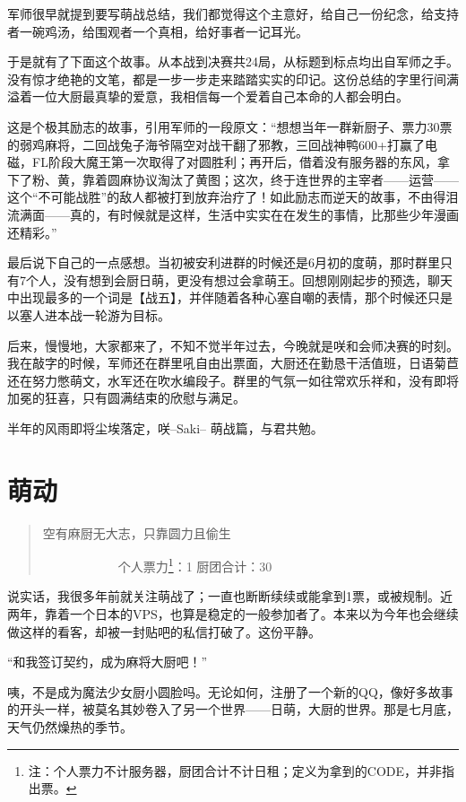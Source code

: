 军师很早就提到要写萌战总结，我们都觉得这个主意好，给自己一份纪念，给支持者一碗鸡汤，给围观者一个真相，给好事者一记耳光。

于是就有了下面这个故事。从本战到决赛共24局，从标题到标点均出自军师之手。没有惊才绝艳的文笔，都是一步一步走来踏踏实实的印记。这份总结的字里行间满溢着一位大厨最真挚的爱意，我相信每一个爱着自己本命的人都会明白。

这是个极其励志的故事，引用军师的一段原文：“想想当年一群新厨子、票力30票的弱鸡麻将，二回战兔子海爷隔空对战干翻了邪教，三回战神鸭600+打赢了电磁，FL阶段大魔王第一次取得了对圆胜利；再开后，借着没有服务器的东风，拿下了粉、黄，靠着圆麻协议淘汰了黄图；这次，终于连世界的主宰者——运营——这个“不可能战胜”的敌人都被打到放弃治疗了！如此励志而逆天的故事，不由得泪流满面——真的，有时候就是这样，生活中实实在在发生的事情，比那些少年漫画还精彩。”

最后说下自己的一点感想。当初被安利进群的时候还是6月初的度萌，那时群里只有7个人，没有想到会厨日萌，更没有想过会拿萌王。回想刚刚起步的预选，聊天中出现最多的一个词是【战五】，并伴随着各种心塞自嘲的表情，那个时候还只是以塞人进本战一轮游为目标。

后来，慢慢地，大家都来了，不知不觉半年过去，今晚就是咲和会师决赛的时刻。我在敲字的时候，军师还在群里吼自由出票面，大厨还在勤恳干活值班，日语菊苣还在努力憋萌文，水军还在吹水编段子。群里的气氛一如往常欢乐祥和，没有即将加冕的狂喜，只有圆满结束的欣慰与满足。

半年的风雨即将尘埃落定，咲–Saki– 萌战篇，与君共勉。

\section{萌动}

\begin{quote}
空有麻厨无大志，只靠圆力且偷生

　　　　　　个人票力\footnote{注：个人票力不计服务器，厨团合计不计日租；定义为拿到的CODE，并非指出票。}：1 厨团合计：30
\end{quote}

说实话，我很多年前就关注萌战了；一直也断断续续或能拿到1票，或被规制。近两年，靠着一个日本的VPS，也算是稳定的一般参加者了。本来以为今年也会继续做这样的看客，却被一封贴吧的私信打破了。这份平静。

 “和我签订契约，成为麻将大厨吧！”

咦，不是成为魔法少女厨小圆脸吗。无论如何，注册了一个新的QQ，像好多故事的开头一样，被莫名其妙卷入了另一个世界——日萌，大厨的世界。那是七月底，天气仍然燥热的季节。

